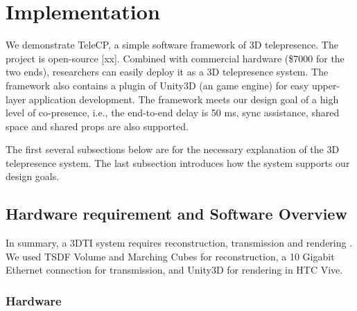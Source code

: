 \section{Implementation}

We demonstrate TeleCP, a simple software framework of 3D telepresence. The project is open-source [xx]. Combined with commercial hardware (\$7000 for the two ends), researchers can easily deploy it as a 3D telepresence system. The framework also contains a plugin of Unity3D (an game engine) for easy upper-layer application development. The framework meets our design goal of a high level of co-presence, i.e., the end-to-end delay is 50 ms, sync assistance, shared space and shared props are also supported.

The first several subsections below are for the necessary explanation of the 3D telepresence system. The last subsection introduces how the system supports our design goals.



\subsection{Hardware requirement and Software Overview}

In summary, a 3DTI system requires reconstruction, transmission and rendering \cite{fuchs2014immersive}. We used TSDF Volume \cite{curless1996volumetric} and Marching Cubes \cite{lorensen1987marching} for reconstruction, a 10 Gigabit Ethernet connection for transmission, and Unity3D for rendering in HTC Vive.

\subsubsection{Hardware}

